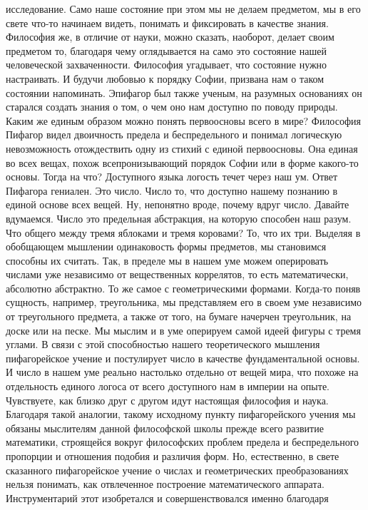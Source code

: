 исследование. Само наше состояние при этом мы не делаем предметом, мы в его
свете что-то начинаем видеть, понимать и фиксировать в качестве знания.
Философия же, в отличие от науки, можно сказать, наоборот, делает своим
предметом то, благодаря чему оглядывается на само это состояние нашей
человеческой захваченности. Философия угадывает, что состояние нужно
настраивать. И будучи любовью к порядку Софии, призвана нам о таком состоянии
напоминать. Эпифагор был также ученым, на разумных основаниях он старался
создать знания о том, о чем оно нам доступно по поводу природы. Каким же единым
образом можно понять первоосновы всего в мире? Философия Пифагор видел
двоичность предела и беспредельного и понимал логическую невозможность
отождествить одну из стихий с единой первоосновы. Она единая во всех вещах,
похож всепронизывающий порядок Софии или в форме какого-то основы. Тогда на что?
Доступного языка логость течет через наш ум. Ответ Пифагора гениален. Это число.
Число то, что доступно нашему познанию в единой основе всех вещей. Ну, непонятно
вроде, почему вдруг число. Давайте вдумаемся. Число это предельная абстракция,
на которую способен наш разум. Что общего между тремя яблоками и тремя коровами?
То, что их три. Выделяя в обобщающем мышлении одинаковость формы предметов, мы
становимся способны их считать. Так, в пределе мы в нашем уме можем оперировать
числами уже независимо от вещественных коррелятов, то есть математически,
абсолютно абстрактно. То же самое с геометрическими формами. Когда-то поняв
сущность, например, треугольника, мы представляем его в своем уме независимо от
треугольного предмета, а также от того, на бумаге начерчен треугольник, на доске
или на песке. Мы мыслим и в уме оперируем самой идеей фигуры с тремя углами. В
связи с этой способностью нашего теоретического мышления пифагорейское учение и
постулирует число в качестве фундаментальной основы. И число в нашем уме реально
настолько отдельно от вещей мира, что похоже на отдельность единого логоса от
всего доступного нам в империи на опыте. Чувствуете, как близко друг с другом
идут настоящая философия и наука. Благодаря такой аналогии, такому исходному
пункту пифагорейского учения мы обязаны мыслителям данной философской школы
прежде всего развитие математики, строящейся вокруг философских проблем предела
и беспредельного пропорции и отношения подобия и различия форм. Но, естественно,
в свете сказанного пифагорейское учение о числах и геометрических
преобразованиях нельзя понимать, как отвлеченное построение математического
аппарата. Инструментарий этот изобретался и совершенствовался именно благодаря
